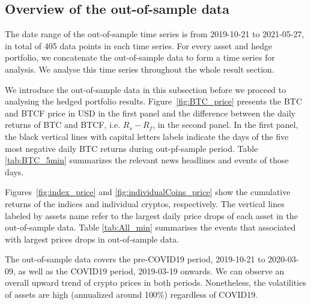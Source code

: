 
\subsection{Overview of the out-of-sample data}\label{subsec:oosdata}

The date range of the out-of-sample time series is from 2019-10-21 to
2021-05-27, in total of 405 data points in each time series. 
For every asset and hedge portfolio, we concatenate the out-of-sample
data to form a time series for analysis. We analyse this time series
throughout the whole result section.   

We introduce the out-of-sample data in this subsection before we
proceed to analysing the hedged portfolio results. 
Figure~\ref{fig:BTC_price} presents the BTC and BTCF price in USD in
the first panel and the difference
between the daily returns of BTC and BTCF, i.e. $R_s - R_f$, in the
second panel. 
In the first panel, the black vertical lines with capital letters
labels indicate the days of the five most negative daily BTC returns
during out-pf-sample period.
Table \ref{tab:BTC_5min} summarizes the relevant news headlines and
events of those days.  

Figures~\ref{fig:index_price} and \ref{fig:individualCoins_price} show
the cumulative returns of the indices and individual cryptos,
respectively.  The vertical lines labeled by assets name refer to the 
largest daily price drops of each asset in the out-of-sample data.  
Table \ref{tab:All_min} summarises the events that associated with largest prices drops in 
out-of-sample data. 

The out-of-sample data covers the pre-COVID19 period, 2019-10-21 to
2020-03-09, as well as the COVID19 period, 2019-03-19 onwards. 
We can observe an overall upward trend of crypto prices in both periods.
Nonetheless, the volatilities of assets are high (annualized around
100\%) regardless of COVID19. 


